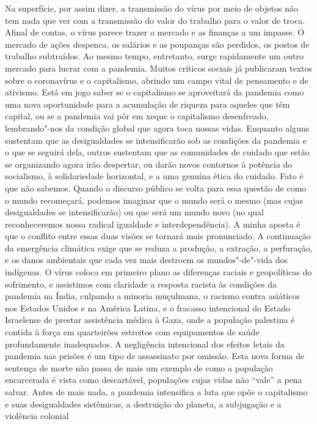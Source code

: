 \begin{multicols}{2}
Na superfície, por assim dizer, a transmissão do vírus por meio de
objetos não tem nada que ver com a transmissão do valor do trabalho para
o valor de troca. Afinal de contas, o vírus parece trazer o mercado e as
finanças a um impasse. O mercado de ações despenca, os salários e as
poupanças são perdidos, os postos de trabalho subtraídos. Ao mesmo
tempo, entretanto, surge rapidamente um outro mercado para lucrar com a
pandemia. Muitos críticos sociais já publicaram textos sobre o
coronavírus e o capitalismo, abrindo um campo vital de pensamento e de
ativismo. Está em jogo saber se o capitalismo se aproveitará da pandemia
como uma nova oportunidade para a acumulação de riqueza para aqueles que
têm capital, ou se a pandemia vai pôr em xeque o capitalismo
desenfreado, lembrando"-nos da condição global que agora toca nossas
vidas. Enquanto alguns sustentam que as desigualdades se intensificarão
sob as condições da pandemia e o que se seguirá dela, outros sustentam
que as comunidades de cuidado que estão se organizando agora irão
despertar, ou darão novos contornos à potência do socialismo, à
solidariedade horizontal, e a uma genuína ética do cuidado. Fato é que
não sabemos. Quando o discurso público se volta para essa questão de
como o mundo recomeçará, podemos imaginar que o mundo será o mesmo (mas
cujas desigualdades se intensificarão) ou que será um mundo novo (no
qual reconheceremos nossa radical igualdade e interdependência). A minha
aposta é que o conflito entre essas duas visões se tornará mais
pronunciado. A continuação da emergência climática exige que se reduza a
produção, a extração, a perfuração, e os danos ambientais que cada vez
mais destroem os mundos"-de"-vida dos indígenas. O vírus coloca em
primeiro plano as diferenças raciais e geopolíticas do sofrimento, e
assistimos com claridade a resposta racista às condições da pandemia na
Índia, culpando a minoria muçulmana, o racismo contra asiáticos nos
Estados Unidos e na América Latina, e o fracasso intencional do Estado
Israelense de prestar assistência médica à Gaza, onde a população
palestina é contida à força em quarteirões estreitos com equipamentos de
saúde profundamente inadequados. A negligência intencional dos efeitos
letais da pandemia nas prisões é um tipo de assassinato por omissão.
Esta nova forma de sentença de morte não passa de mais um exemplo de
como a população encarcerada é vista como descartável, populações cujas
vidas não ``vale'' a pena salvar. Antes de mais nada, a pandemia
intensifica a luta que opõe o capitalismo e suas desigualdades
sistêmicas, a destruição do planeta, a subjugação e a violência colonial

\end{multicols}
